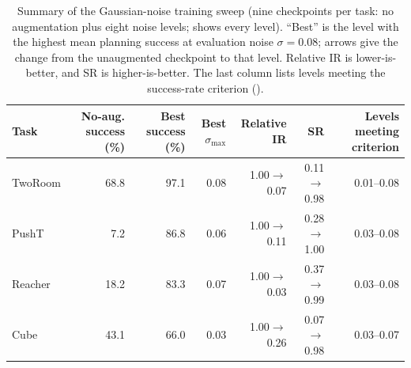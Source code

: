 \begin{table}[t]
\centering
\caption{Summary of the Gaussian-noise training sweep (nine checkpoints per task: no augmentation plus eight noise levels;  shows every level). ``Best'' is the level with the highest mean planning success at evaluation noise $\sigma=0.08$; arrows give the change from the unaugmented checkpoint to that level. Relative IR is lower-is-better, and SR is higher-is-better. The last column lists levels meeting the success-rate criterion ().}
\label{tab:full-sweep-compact}
\footnotesize
\setlength{\tabcolsep}{3.5pt}
\begin{tabular}{lrrrrrr}
\toprule
Task & No-aug. success (\%) & Best success (\%) & Best $\sigma_{\max}$ & Relative IR & SR & Levels meeting criterion \\
\midrule
TwoRoom & 68.8 & 97.1 & 0.08 & 1.00$\to$0.07 & 0.11$\to$0.98 & 0.01--0.08 \\
PushT & 7.2 & 86.8 & 0.06 & 1.00$\to$0.11 & 0.28$\to$1.00 & 0.03--0.08 \\
Reacher & 18.2 & 83.3 & 0.07 & 1.00$\to$0.03 & 0.37$\to$0.99 & 0.03--0.08 \\
Cube & 43.1 & 66.0 & 0.03 & 1.00$\to$0.26 & 0.07$\to$0.98 & 0.03--0.07 \\
\bottomrule
\end{tabular}
\end{table}
